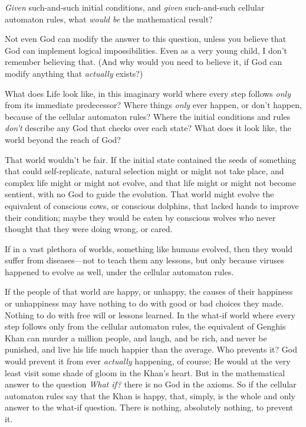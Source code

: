 {
 \textit{Given} such-and-such initial conditions, and
\textit{given} such-and-such cellular automaton rules, what
\textit{would be} the mathematical result?}

{
 Not even God can modify the answer to this question, unless you
believe that God can implement logical impossibilities. Even as a very
young child, I don't remember believing that. (And why
would you need to believe it, if God can modify anything that
\textit{actually} exists?)}

{
 What does Life look like, in this imaginary world where every step
follows \textit{only} from its immediate predecessor? Where things
\textit{only} ever happen, or don't happen, because of
the cellular automaton rules? Where the initial conditions and rules
\textit{don't} describe any God that checks over each
state? What does it look like, the world beyond the reach of God?}

{
 That world wouldn't be fair. If the initial state
contained the seeds of something that could self-replicate, natural
selection might or might not take place, and complex life might or
might not evolve, and that life might or might not become sentient,
with no God to guide the evolution. That world might evolve the
equivalent of conscious cows, or conscious dolphins, that lacked hands
to improve their condition; maybe they would be eaten by conscious
wolves who never thought that they were doing wrong, or cared.}

{
 If in a vast plethora of worlds, something like humans evolved,
then they would suffer from diseases---not to teach them any lessons,
but only because viruses happened to evolve as well, under the cellular
automaton rules.}

{
 If the people of that world are happy, or unhappy, the causes of
their happiness or unhappiness may have nothing to do with good or bad
choices they made. Nothing to do with free will or lessons learned. In
the what-if world where every step follows only from the cellular
automaton rules, the equivalent of Genghis Khan can murder a million
people, and laugh, and be rich, and never be punished, and live his
life much happier than the average. Who prevents it? God would prevent
it from ever \textit{actually} happening, of course; He would at the
very least visit some shade of gloom in the Khan's
heart. But in the mathematical answer to the question \textit{What if?}
there is no God in the axioms. So if the cellular automaton rules say
that the Khan is happy, that, simply, is the whole and only answer to
the what-if question. There is nothing, absolutely nothing, to prevent
it.}

